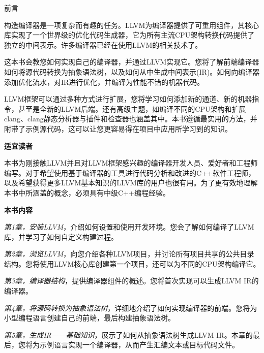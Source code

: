 \begin{flushright}
	 前言
\end{flushright}

构造编译器是一项复杂而有趣的任务。LLVM为编译器提供了可重用组件，其核心库实现了一个世界级的优化代码生成器，它为所有主流CPU架构转换代码提供了独立的中间表示。许多编译器已经在使用LLVM的相关技术了。\par

这本书会教您如何实现自己的编译器，并通过LLVM实现它。您将了解前端编译器如何将源代码转换为抽象语法树，以及如何从中生成中间表示(IR)。如何向编译器添加优化流水，对IR进行优化，并编译为性能不错的机器代码。\par

LLVM框架可以通过多种方式进行扩展，您将学习如何添加新的通道、新的机器指令，甚至是全新的LLVM后端。还有高级主题，如编译不同的CPU架构和扩展clang、clang静态分析器与插件和检查器也涵盖其中。本书遵循最实用的方法，并附带了示例源代码，这可以让您更容易得在项目中应用所学习到的知识。\par

\hspace*{\fill} \par %
\textbf{适宜读者}

本书为刚接触LLVM并且对LLVM框架感兴趣的编译器开发人员、爱好者和工程师编写。对于希望使用基于编译器的工具进行代码分析和改进的C++软件工程师，以及希望获得更多LLVM基本知识的LLVM库的用户也很有用。为了更有效地理解本书中所涵盖的概念，必须具有中级C++编程经验。\par

\hspace*{\fill} \par %
\textbf{本书内容}

\textit{第1章，安装LLVM}，介绍如何设置和使用开发环境。您会了解如何编译了LLVM库，并学习了如何自定义构建过程。\par

\textit{第2章，浏览LLVM}，向您介绍各种LLVM项目，并讨论所有项目共享的公共目录结构。您将使用LLVM核心库创建第一个项目，还可以为不同的CPU架构编译它。\par

\textit{第3章，编译器结构}，提供编译器组件的概述。您将首次实现可以生成LLVM IR的编译器。\par

\textit{第4章，将源码转换为抽象语法树}，详细地介绍了如何实现编译器的前端。您将为小型编程语言创建自己的前端，最后构建抽象语法树。\par

\textit{第5章，生成IR——基础知识}，展示了如何从抽象语法树生成LLVM IR。本章的最后，您将为示例语言实现一个编译器，从而产生汇编文本或目标代码文件。\par

